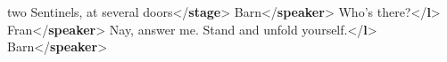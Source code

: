 \begin{shaded}
\hspace*{1em}\hspace*{1em}\hspace*{1em}\hspace*{1em} two Sentinels, at several doors{</\textbf{stage}>}\mbox{}\newline 
\hspace*{1em}\mbox{}\newline 
\hspace*{1em}\hspace*{1em}Barn{</\textbf{speaker}>}\mbox{}\newline 
\hspace*{1em}\hspace*{1em}Who's there?{</\textbf{l}>}\mbox{}\newline 
\hspace*{1em}\mbox{}\newline 
\hspace*{1em}\mbox{}\newline 
\hspace*{1em}\hspace*{1em}Fran{</\textbf{speaker}>}\mbox{}\newline 
\hspace*{1em}\hspace*{1em}Nay, answer me. Stand and unfold yourself.{</\textbf{l}>}\mbox{}\newline 
\hspace*{1em}\mbox{}\newline 
\hspace*{1em}\mbox{}\newline 
\hspace*{1em}\hspace*{1em}Barn{</\textbf{speaker}>}\mbox{}\newline 

\end{shaded}
